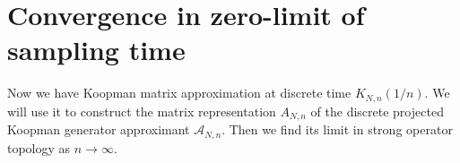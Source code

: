 \documentclass{article}[11]
\newtheorem*{remark}{Remark}
\begin{document}
	
	
	
	\newpage
	\section{Convergence in zero-limit of sampling time}
	Now we have Koopman matrix approximation at discrete time $K_{N,n}(1/n)$. We will use it to construct the matrix representation $A_{N,n}$ of the discrete projected Koopman generator approximant $\mathcal{A}_{N,n}$. Then we find its limit in strong operator topology as $n\to\infty$. 
	
\end{document}
